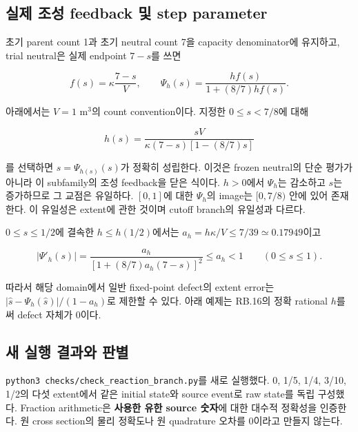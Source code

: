 \documentclass[11pt,a4paper]{article}
\begin{document}
\hypertarget{uxc2e4uxc81c-uxc870uxc131-feedback-uxbc0f-step-parameter}{%
\subsection{실제 조성 feedback 및 step parameter}\label{uxc2e4uxc81c-uxc870uxc131-feedback-uxbc0f-step-parameter}}

초기 parent count 1과 초기 neutral count 7을 capacity denominator에 유지하고, trial neutral은 실제 endpoint \(7-s\)를 쓰면

\[f(s)=\kappa\frac{7-s}{V},\qquad \Psi_h(s)=\frac{hf(s)}{1+(8/7)hf(s)}.\tag{RB.15}\]

아래에서는 \(V=1\) m\(^3\)의 count convention이다. 지정한 \(0\le s<7/8\)에 대해

\[h(s)=\frac{sV}{\kappa(7-s)[1-(8/7)s]}\tag{RB.16}\]

를 선택하면 \(s=\Psi_{h(s)}(s)\)가 정확히 성립한다. 이것은 frozen neutral의 단순 평가가 아니라 이 subfamily의 조성 feedback을 닫은 식이다. \(h>0\)에서 \(\Psi_h\)는 감소하고 \(s\)는 증가하므로 그 교점은 유일하다. \([0,1]\)에 대한 \(\Psi_h\)의 image는 \([0,7/8)\) 안에 있어 존재한다. 이 유일성은 extent에 관한 것이며 cutoff branch의 유일성과 다르다.

\(0\le s\le1/2\)에 결속한 \(h\le h(1/2)\)에서는 \(a_h=h\kappa/V\le7/39\simeq0.17949\)이고

\[|\Psi'_h(s)|=\frac{a_h}{[1+(8/7)a_h(7-s)]^2}\le a_h<1\qquad(0\le s\le1).\tag{RB.17}\]

따라서 해당 domain에서 일반 fixed-point defect의 extent error는 \(|\widehat s-\Psi_h(\widehat s)|/(1-a_h)\)로 제한할 수 있다. 아래 예제는 RB.16의 정확 rational \(h\)를 써 defect 자체가 0이다.

\hypertarget{uxc0c8-uxc2e4uxd589-uxacb0uxacfcuxc640-uxd310uxbcc4}{%
\subsection{새 실행 결과와 판별}\label{uxc0c8-uxc2e4uxd589-uxacb0uxacfcuxc640-uxd310uxbcc4}}

\nolinkurl{python3 checks/check_reaction_branch.py}를 새로 실행했다. 0, 1/5, 1/4, 3/10, 1/2의 다섯 extent에서 같은 initial state와 source event로 raw state를 독립 구성했다. Fraction arithmetic은 \textbf{사용한 유한 source 숫자}에 대한 대수적 정확성을 인증한다. 원 cross section의 물리 정확도나 원 quadrature 오차를 0이라고 만들지 않는다.
\end{document}
